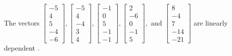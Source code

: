 \begin{exercise}
\begin{exerciseStatement}
  \end{exerciseStatement}
  \begin{exerciseAnswer}
   The vectors \(\left[\begin{array}{r}
-5 \\
4 \\
5 \\
-4 \\
-6
\end{array}\right] , \left[\begin{array}{r}
-5 \\
4 \\
-4 \\
3 \\
4
\end{array}\right] , \left[\begin{array}{r}
-1 \\
0 \\
5 \\
-1 \\
-1
\end{array}\right] , \left[\begin{array}{r}
2 \\
-6 \\
0 \\
-1 \\
5
\end{array}\right] , \text{ and } \left[\begin{array}{r}
8 \\
-4 \\
7 \\
-14 \\
-21
\end{array}\right]\) are 
  	 linearly dependent  .
  


  \end{exerciseAnswer}
\end{exercise}